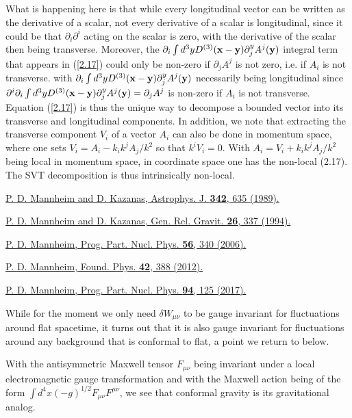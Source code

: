 \documentclass[aps,onecolumn,10pt]{revtex4}
\numberwithin{equation}{section}
\numberwithin{equation}{section}
\begin{document}
\begin{thebibliography}{99}
 What is happening here is that while every longitudinal vector can be written as the derivative of a scalar, not every derivative of a scalar is longitudinal, since it could be that $\partial_i\partial^i$ acting on the scalar is zero, with the derivative of the scalar then being transverse. Moreover, the $\partial_i\int d^3yD^{(3)}(\mathbf{x}-\mathbf{y})\partial^y_jA^j({\bf y})$ integral term that appears in (\ref{2.17}) could only be non-zero if $\partial_jA^j$ is not zero, i.e. if $A_i$ is not transverse. with $\partial_i\int d^3yD^{(3)}(\mathbf{x}-\mathbf{y})\partial^y_jA^j({\bf y})$ necessarily being longitudinal since $\partial^i\partial_i\int d^3yD^{(3)}(\mathbf{x}-\mathbf{y})\partial^y_jA^j({\bf y})=\partial_jA^j$ is non-zero if $A_i$ is not transverse. Equation (\ref{2.17}) is thus the unique way to decompose a bounded vector into its transverse and longitudinal components. In addition, we note that extracting the transverse component $V_i$ of a vector $A_i$ can also be done in momentum space, where one sets $V_i=A_i-k_ik^jA_j/k^2$ so that $k^iV_i=0$. With  $A_i=V_i+k_ik^jA_j/k^2$ being local in momentum space, in coordinate space one has the non-local (2.17). The SVT decomposition is thus intrinsically non-local.

 \href{https://doi.org/10.1086/167623}{P. D. Mannheim and D. Kazanas, Astrophys. J. \textbf{342}, 635 (1989).} 

 \href{https://doi.org/10.1007/BF02105226}{P. D. Mannheim and D. Kazanas, Gen. Rel. Gravit. \textbf{26}, 337 (1994).}

 \href{https://doi.org/10.1016/j.ppnp.2005.08.001}{P. D. Mannheim, Prog. Part. Nucl. Phys. \textbf{ 56}, 340 (2006). }

 \href{https://doi.org/10.1007/s10701-011-9608-6}{P. D. Mannheim, Found. Phys. \textbf{42}, 388 (2012).}

  \href{https://doi.org/10.1016/j.ppnp.2017.02.001}{P. D. Mannheim, Prog. Part. Nucl. Phys. \textbf{94}, 125 (2017).}

 While for the moment we only need $\delta W_{\mu\nu}$ to be gauge invariant for fluctuations around flat spacetime, it turns out \cite{Amarasinghe2018} that it is also gauge invariant for fluctuations around any background that is conformal to flat, a point we return to below.

 With the antisymmetric Maxwell tensor $F_{\mu\nu}$ being invariant under a local electromagnetic gauge transformation and with the Maxwell action being of the form $\int d^4x(-g)^{1/2}F_{\mu\nu}F^{\mu\nu}$, we see that conformal gravity is its gravitational analog. 


\end{thebibliography}
\end{document}
